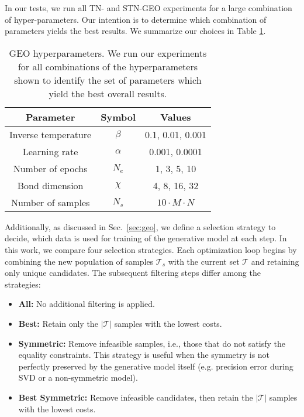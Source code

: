 In our tests, we run all TN- and STN-GEO experiments for a large combination of hyper-parameters. Our intention is to determine which combination of parameters yields the best results. We summarize our choices in Table \ref{table:hyper_parameters}.
\begin{table}[!h]
    \centering
    \begin{tabular}{|c|c|c|}
        \hline
        Parameter & Symbol & Values \\
        \hline
       Inverse temperature & $\beta$ & 0.1, 0.01, 0.001 \\
        \hline
        Learning rate & $\alpha$ & 0.001, 0.0001 \\
        \hline
        Number of epochs & $N_e$ & 1, 3, 5, 10 \\
        \hline
        Bond dimension & $\chi$ & 4, 8, 16, 32 \\
        \hline
        Number of samples & $N_s$ & $10\cdot M\cdot N$ \\
        \hline
    \end{tabular}
    \caption{GEO hyperparameters. We run our experiments for all combinations of the hyperparameters shown to identify the set of parameters which yield the best overall results.}
    \label{table:hyper_parameters}
\end{table}
Additionally, as discussed in Sec.~\ref{sec:geo}, we define a selection strategy to decide, which data is used for training of the generative model at each step.  In this work, we compare four selection strategies. Each optimization loop begins by combining the new population of samples $\mathcal T_s$ with the current set $\mathcal{T}$ and retaining only unique candidates. The subsequent filtering steps differ among the strategies: 
\begin{itemize} 
\item \textbf{All:} No additional filtering is applied. 
\item \textbf{Best:} Retain only the $|\mathcal{T}|$ samples with the lowest costs. 
\item \textbf{Symmetric:} Remove infeasible samples, i.e., those that do not satisfy the equality constraints. This strategy is useful when the symmetry is not perfectly preserved by the generative model itself (e.g. precision error during SVD or a non-symmetric model).
\item \textbf{Best Symmetric:} Remove infeasible candidates, then retain the $|\mathcal{T}|$ samples with the lowest costs. \end{itemize}

